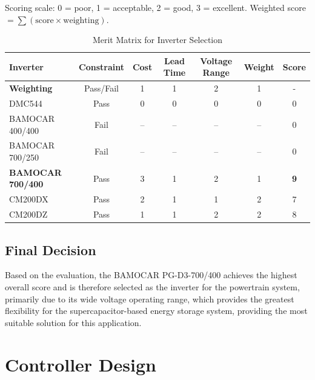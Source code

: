 \documentclass[11pt, a4paper]{report}
\numberwithin{equation}{section}
\begin{document}
\begin{refsection}
\begin{table}[H]
\caption{Merit Matrix for Inverter Selection}
\label{tab:inverter_selection}

\small
Scoring scale: 0 = poor, 1 = acceptable, 2 = good, 3 = excellent.  
Weighted score $= \sum (\text{score} \times \text{weighting})$.

\begin{tabular}{lcccccc}
\toprule

Inverter 
& Constraint 
& Cost 
& Lead Time 
& Voltage Range 
& Weight 
& Score \\

\midrule

\textbf{Weighting}
& Pass/Fail
& 1
& 1
& 2
& 1
& - \\

\midrule

DMC544 
& Pass 
& 0 
& 0 
& 0 
& 0 
& 0 \\

BAMOCAR 400/400 
& Fail 
& -- 
& -- 
& -- 
& -- 
& 0 \\

BAMOCAR 700/250 
& Fail 
& -- 
& -- 
& -- 
& -- 
& 0 \\

\textbf{BAMOCAR 700/400} 
& Pass 
& 3 
& 1 
& 2 
& 1 
& \textbf{9} \\

CM200DX 
& Pass 
& 2 
& 1 
& 1 
& 2 
& 7 \\

CM200DZ 
& Pass 
& 1 
& 1 
& 2 
& 2 
& 8 \\

\bottomrule
\end{tabular}
\end{table}

\subsection{Final Decision}

Based on the evaluation, the BAMOCAR PG-D3-700/400 achieves the highest overall score and is therefore selected as the inverter for the powertrain system, primarily due to its wide voltage operating range, which provides the greatest flexibility for the supercapacitor-based energy storage system, providing the most suitable solution for this application.

\section{Controller Design}


\end{refsection}
\end{document}
